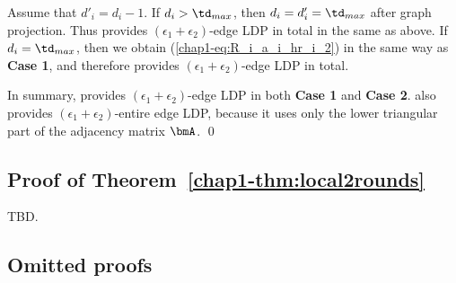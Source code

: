 Assume that $d'_i = d_i - 1$. 
If $d_i > \td_{max}$, then $d_i = d'_i = \td_{max}$ after graph projection. 
Thus  provides $(\epsilon_1 + \epsilon_2)$-edge LDP in total in the same as above. 
If $d_i = \td_{max}$, then we obtain (\ref{chap1-eq:R_i_a_i_hr_i_2}) in the same way as \textbf{Case 1}, and therefore  provides $(\epsilon_1 + \epsilon_2)$-edge LDP in total.

\smallskip
In summary,  provides $(\epsilon_1 + \epsilon_2)$-edge LDP in both \textbf{Case 1} and \textbf{Case 2}. 
 also provides $(\epsilon_1 + \epsilon_2)$-entire edge LDP, because it uses only the lower triangular part of the adjacency matrix $\bmA$. \qed

\subsection{Proof of Theorem~\ref{chap1-thm:local2rounds}}
TBD.


\subsection{Omitted proofs}




